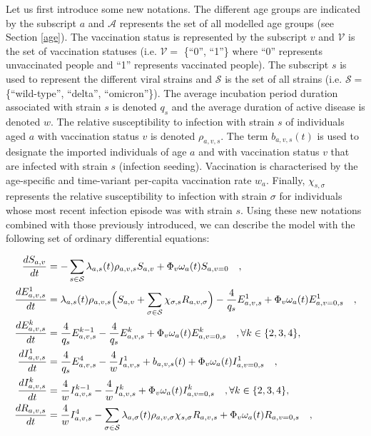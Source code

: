 Let us first introduce some new notations. The different age groups are indicated by the subscript $a$ and $\mathcal{A}$ represents
the set of all modelled age groups (see Section \ref{age}). The vaccination status is represented by the subscript $v$ and $\mathcal{V}$ is the set of 
vaccination statuses (i.e. $\mathcal{V}=$ \{``0'', ``1''\} where ``0'' represents unvaccinated people and ``1'' represents vaccinated people). The subscript $s$ is used to represent the different viral strains and $\mathcal{S}$ is the set 
of all strains (i.e. $\mathcal{S}=$ \{``wild-type'', ``delta'', ``omicron''\}). The average incubation period duration associated with strain $s$ is denoted $q_s$ and
the average duration of active disease is denoted $w$. The relative susceptibility to infection with strain $s$ of individuals aged $a$ with 
vaccination status $v$ is denoted $\rho_{a,v,s}$. The term $b_{a,v,s}(t)$ is used to designate the imported individuals of age $a$ and 
with vaccination status $v$ that are infected with strain $s$ (infection seeding). Vaccination is characterised by the age-specific
and time-variant per-capita vaccination rate $w_a$. Finally, $\chi_{s,\sigma}$ represents the relative susceptibility to infection
with strain $\sigma$ for individuals whose most recent infection episode was with strain $s$. Using these new notations combined 
with those previously introduced, we can describe the model with the following set of ordinary differential equations:

\begin{equation}
    \label{ode}
    \begin{split}
\frac{dS_{a,v}}{dt} & = -\sum_{s \in \mathcal{S}} \lambda_{a,s}(t)\rho_{a,v,s} S_{a,v} + \Phi_v\omega_a(t)S_{a,v=0}  \quad , \\
\frac{dE_{a,v,s}^{1}}{dt} & =\lambda_{a,s}(t)\rho_{a,v,s} \Bigl(S_{a,v}  +  \sum_{\sigma \in \mathcal{S}} \chi_{\sigma, s} R_{a,v,\sigma} \Bigr) - \frac{4}{q_{s}}E_{a,v,s}^{1} + \Phi_v\omega_a(t)E_{a,v=0,s}^1 \quad , \\
\frac{dE_{a,v,s}^{k}}{dt} & = \frac{4}{q_{s}}E_{a,v,s}^{k-1} - \frac{4}{q_{s}}E_{a,v,s}^{k} + \Phi_v\omega_a(t)E_{a,v=0,s}^k \quad,  \forall k \in \{2,3,4\} , \\
\frac{dI_{a,v,s}^{1}}{dt} & = \frac{4}{q_{s}}E_{a,v,s}^{4} - \frac{4}{w}I_{a,v,s}^{1} + b_{a,v,s}(t) + \Phi_v\omega_a(t)I_{a,v=0,s}^1 \quad , \\
\frac{dI_{a,v,s}^{k}}{dt} & = \frac{4}{w}I_{a,v,s}^{k-1} - \frac{4}{w}I_{a,v,s}^{k} + \Phi_v\omega_a(t)I_{a,v=0,s}^k \quad, \forall k \in \{2,3,4\} , \\
\frac{dR_{a,v,s}}{dt} & = \frac{4}{w}I_{a,v,s}^{4} - \sum _{\sigma \in \mathcal{S}} \lambda_{a,\sigma}(t)\rho_{a,v,\sigma} \chi_{s, \sigma} R_{a,v, s} + \Phi_v\omega_a(t)R_{a,v=0,s} \quad, 
    \end{split}
\end{equation}

